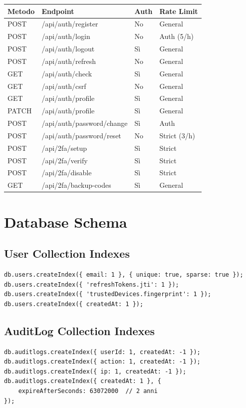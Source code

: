 \documentclass[12pt,a4paper]{report}
\begin{document}
\begin{longtable}{@{}llll@{}}
\toprule
\textbf{Metodo} & \textbf{Endpoint} & \textbf{Auth} & \textbf{Rate Limit} \\
\midrule
\endhead
POST & /api/auth/register & No & General \\
POST & /api/auth/login & No & Auth (5/h) \\
POST & /api/auth/logout & Sì & General \\
POST & /api/auth/refresh & No & General \\
GET & /api/auth/check & Sì & General \\
GET & /api/auth/csrf & No & General \\
GET & /api/auth/profile & Sì & General \\
PATCH & /api/auth/profile & Sì & General \\
POST & /api/auth/password/change & Sì & Auth \\
POST & /api/auth/password/reset & No & Strict (3/h) \\
\midrule
POST & /api/2fa/setup & Sì & Strict \\
POST & /api/2fa/verify & Sì & Strict \\
POST & /api/2fa/disable & Sì & Strict \\
GET & /api/2fa/backup-codes & Sì & General \\
\bottomrule
\end{longtable}

\chapter{Database Schema}

\section{User Collection Indexes}

\begin{lstlisting}[caption={User Indexes}]
db.users.createIndex({ email: 1 }, { unique: true, sparse: true });
db.users.createIndex({ 'refreshTokens.jti': 1 });
db.users.createIndex({ 'trustedDevices.fingerprint': 1 });
db.users.createIndex({ createdAt: 1 });
\end{lstlisting}

\section{AuditLog Collection Indexes}

\begin{lstlisting}[caption={AuditLog Indexes}]
db.auditlogs.createIndex({ userId: 1, createdAt: -1 });
db.auditlogs.createIndex({ action: 1, createdAt: -1 });
db.auditlogs.createIndex({ ip: 1, createdAt: -1 });
db.auditlogs.createIndex({ createdAt: 1 }, { 
    expireAfterSeconds: 63072000  // 2 anni 
});
\end{lstlisting}
\end{document}
